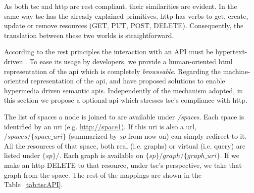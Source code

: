 As both \ac{tsc} and \ac{http} are \ac{rest} compliant, their similarities are evident.
In the same way \ac{tsc} has the already explained primitives, \ac{http} has verbs to get, create, update or remove resources (GET, PUT, POST, DELETE).
Consequently, the translation between these two worlds is straightforward.

\begin{sloppypar}
According to the \ac{rest} principles the interaction with an API must be hypertext-driven \citep{fielding_rest_2008}.
To ease its usage by developers, we provide a human-oriented \acs{html} representation of the \ac{api} which is completely \emph{browseable}.
Regarding the machine-oriented representation of the \ac{api}, \citet{verborgh_functional_2012} and \citet{kjernsmo_necessity_2012} have proposed solutions to enable hypermedia driven semantic \acp{api}. %
Independently of the mechanism adopted, in this section we propose a optional \ac{api} which stresses \ac{tsc}'s compliance with \ac{http}.
\end{sloppypar}

The list of spaces a node is joined to are available under \textit{/spaces}.
Each space is identified by an \acs{uri} (e.g. \url{http://space1}).
If this \acs{uri} is also a \acs{url}, $/spaces/\{space\_uri\}$ (summarized by \emph{sp} from now on) can simply redirect to it.
All the resources of that space, both real (i.e. graphs) or virtual (i.e. query) are listed under $\{sp\}/$.
Each graph is available on ${\{sp\}/graph/\{graph\_uri\}}$.
If we make an \acs{http} DELETE to that resource, under \ac{tsc}'s perspective, we take that graph from the space.
The rest of the mappings are shown in the Table~\ref{tab:tscAPI}.

